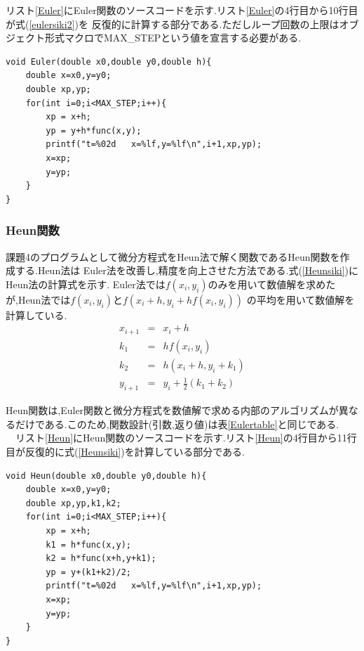 \documentclass[dvipdfmx]{jarticle}
\begin{document}
        リスト\ref{Euler}にEuler関数のソースコードを示す.リスト\ref{Euler}の4行目から10行目が式(\ref{eulersiki2})を
        反復的に計算する部分である.ただしループ回数の上限はオブジェクト形式マクロでMAX\_STEPという値を宣言する必要がある.
      \begin{lstlisting}[basicstyle=\ttfamily\footnotesize, frame=single,label=Euler,caption=Euler関数]
void Euler(double x0,double y0,double h){
    double x=x0,y=y0;
    double xp,yp;
    for(int i=0;i<MAX_STEP;i++){
        xp = x+h;
        yp = y+h*func(x,y);
        printf("t=%02d   x=%lf,y=%lf\n",i+1,xp,yp);
        x=xp;
        y=yp;
    }
}
      \end{lstlisting}

      \subsubsection{Heun関数}
      課題4のプログラムとして微分方程式をHeun法で解く関数であるHeun関数を作成する.Heun法は
      Euler法を改善し,精度を向上させた方法である.式(\ref{Heunsiki})にHeun法の計算式を示す.
      Euler法では$f(x_i,y_i)$のみを用いて数値解を求めたが,Heun法では$f(x_i,y_i)$と$f(x_i+h,y_i+hf(x_i,y_i))$
      の平均を用いて数値解を計算している.
      \begin{eqnarray}
        x_{i+1} &=& x_i+h \label{eulersiki1}\\
        k_1 &=& hf(x_i,y_i)\\
        k_2 &=& h(x_i+h,y_i+k_1) \\
        y_{i+1} &=& y_i + \frac{1}{2}(k_1+k_2)
            \label{Heunsiki}
      \end{eqnarray}

      Heun関数は,Euler関数と微分方程式を数値解で求める内部のアルゴリズムが異なるだけである.このため,関数設計(引数,返り値)は表\ref{Eulertable}と同じである.\\
      　リスト\ref{Heun}にHeun関数のソースコードを示す.リスト\ref{Heun}の4行目から11行目が反復的に式(\ref{Heunsiki})を計算している部分である.
    \begin{lstlisting}[basicstyle=\ttfamily\footnotesize, frame=single,label=Heun,caption=Heun関数]
void Heun(double x0,double y0,double h){
    double x=x0,y=y0;
    double xp,yp,k1,k2;
    for(int i=0;i<MAX_STEP;i++){
        xp = x+h;
        k1 = h*func(x,y);
        k2 = h*func(x+h,y+k1);
        yp = y+(k1+k2)/2;
        printf("t=%02d   x=%lf,y=%lf\n",i+1,xp,yp);
        x=xp;
        y=yp;
    }
}
    \end{lstlisting}     　
      
\end{document}
